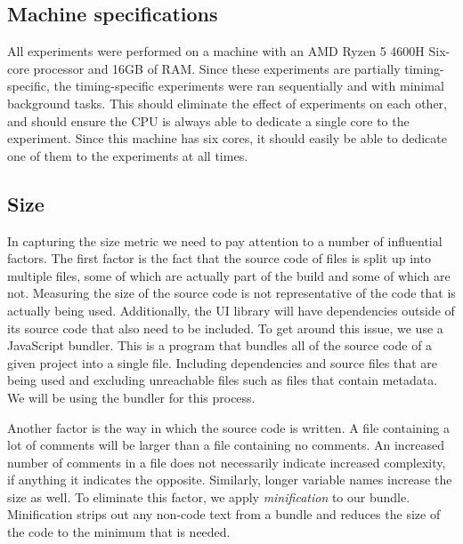 \subsection{Machine specifications}\label{sec:experimental-setup:machine-specs}
All experiments were performed on a machine with an AMD Ryzen 5 4600H Six-core processor and 16GB of RAM. Since these experiments are partially timing-specific, the timing-specific experiments were ran sequentially and with minimal background tasks. This should eliminate the effect of experiments on each other, and should ensure the CPU is always able to dedicate a single core to the experiment. Since this machine has six cores, it should easily be able to dedicate one of them to the experiments at all times.

\subsection{Size}\label{sec:experimental-setup:size}
In capturing the size metric we need to pay attention to a number of influential factors. The first factor is the fact that the source code of files is split up into multiple files, some of which are actually part of the build and some of which are not. Measuring the size of the source code is not representative of the code that is actually being used. Additionally, the UI library will have dependencies outside of its source code that also need to be included. To get around this issue, we use a JavaScript bundler. This is a program that bundles all of the source code of a given project into a single file. Including dependencies and source files that are being used and excluding unreachable files such as files that contain metadata. We will be using the  bundler for this process.

Another factor is the way in which the source code is written. A file containing a lot of comments will be larger than a file containing no comments. An increased number of comments in a file does not necessarily indicate increased complexity, if anything it indicates the opposite. Similarly, longer variable names increase the size as well. To eliminate this factor, we apply \emph{minification} to our bundle. Minification strips out any non-code text from a bundle and reduces the size of the code to the minimum that is needed.

